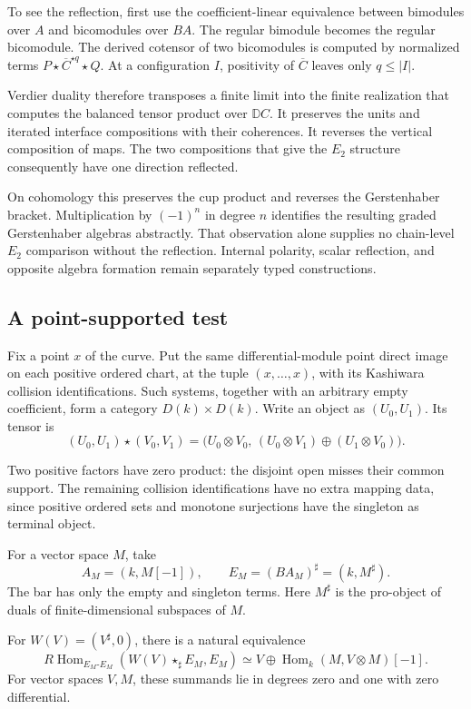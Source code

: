 To see the reflection, first use the
coefficient-linear equivalence between
bimodules over $A$ and bicomodules over
$BA$. The regular bimodule becomes the
regular bicomodule. The derived cotensor
of two bicomodules is computed by
normalized terms
$P\star\overline C^{\star q}\star Q$.
At a configuration $I$, positivity of
$\overline C$ leaves only $q\leq|I|$.

Verdier duality therefore transposes a
finite limit into the finite realization
that computes the balanced tensor
product over $\mathbb DC$. It preserves
the units and iterated interface
compositions with their coherences.
It reverses the vertical composition
of maps. The two compositions that
give the $E_2$ structure consequently
have one direction reflected.

On cohomology this preserves the cup
product and reverses the Gerstenhaber
bracket. Multiplication by $(-1)^n$ in
degree $n$ identifies the resulting
graded Gerstenhaber algebras abstractly.
That observation alone supplies no
chain-level $E_2$ comparison without
the reflection. Internal polarity,
scalar reflection, and opposite
algebra formation remain separately
typed constructions.

\subsection{A point-supported test}
\label{v4-arith:centers:subsec:point-test}

Fix a point $x$ of the curve. Put the
same differential-module point direct
image on each positive ordered chart,
at the tuple $(x,\ldots,x)$, with its
Kashiwara collision identifications.
Such systems, together with an arbitrary
empty coefficient, form a category
$D(k)\times D(k)$. Write an object as
$(U_0,U_1)$. Its tensor is
\[
 (U_0,U_1)\star(V_0,V_1)
 =
 \bigl(U_0\otimes V_0,\,
 (U_0\otimes V_1)\oplus(U_1\otimes V_0)\bigr).
\]

Two positive factors have zero product:
the disjoint open misses their common
support. The remaining collision
identifications have no extra mapping
data, since positive ordered sets and
monotone surjections have the singleton
as terminal object.

For a vector space $M$, take
\[
 A_M=(k,M[-1]),\qquad
 E_M=(BA_M)^\sharp=(k,M^\sharp).
\]
The bar has only the empty and singleton
terms. Here $M^\sharp$ is the pro-object
of duals of finite-dimensional subspaces
of $M$.

\begin{lemma}\label{v4-arith:centers:lem:point-test}
For $W(V)=(V^\sharp,0)$, there is a
natural equivalence
\[
 R\operatorname{Hom}_{E_M\text{-}E_M}
       (W(V)\star_\sharp E_M,E_M)
 \simeq
 V\oplus\operatorname{Hom}_k(M,V\otimes M)[-1].
\]
For vector spaces $V,M$, these summands
lie in degrees zero and one with zero
differential.
\end{lemma}

